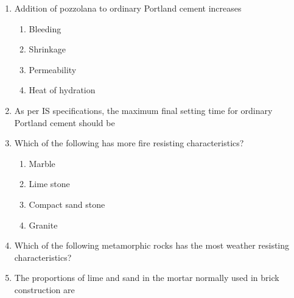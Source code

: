 \documentclass[11pt,a4paper]{article}
\begin{document}
\begin{enumerate}
\item{Addition of pozzolana to ordinary Portland cement increases}
\begin{enumerate}[label=\Alph*.]
\item{Bleeding}
\item{Shrinkage}
\item{Permeability}
\item{Heat of hydration}
\end{enumerate}
\item{As per IS specifications, the maximum final setting time for ordinary Portland cement should be}
\\
\item{Which of the following has more fire resisting characteristics?}
\begin{enumerate}[label=\Alph*.]
\item{Marble}
\item{Lime stone}
\item{Compact sand stone}
\item{Granite}
\end{enumerate}
\item{Which of the following metamorphic rocks has the most weather resisting characteristics?}
\\
\item{The proportions of lime and sand in the mortar normally used in brick construction are}
\\\begin{enumerate*}[itemjoin=\qquad, label=\Alph*.]

\end{enumerate*}
\end{enumerate}
\end{document}
